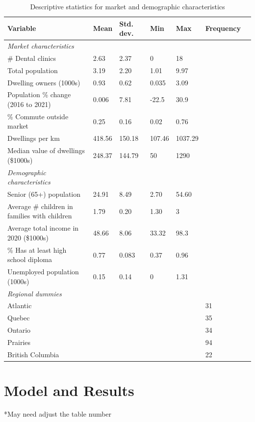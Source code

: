 \documentclass[a4paper,11pt]{article}
\begin{document}
\begin{table}[ht]
\centering
\caption{Descriptive statistics for market and demographic characteristics}
\label{table1}
\begin{tabular}{@{}lllllll@{}}
\toprule
Variable & Mean & Std. dev. & Min & Max & Frequency \\ \midrule
\textit{Market characteristics} & & & & & \\
\# Dental clinics & 2.63 & 2.37 & 0 & 18 &  \\
Total population & 3.19 & 2.20 & 1.01 & 9.97 & \\
Dwelling owners (1000s) & 0.93 & 0.62 & 0.035 & 3.09 & \\
Population \% change (2016 to 2021) & 0.006 &	7.81 & -22.5 & 30.9 & \\
\% Commute outside market & 0.25 & 0.16 & 0.02 & 0.76 & \\
Dwellings per km & 418.56 &	150.18 & 107.46 & 1037.29 & \\
Median value of dwellings (\$1000s) & 248.37 & 144.79 &	50 & 1290 & \\ 
\textit{Demographic characteristics} & & & & & \\
Senior (65+) population & 24.91 & 8.49 & 2.70 & 54.60 & \\
Average \# children in families with children & 1.79 & 0.20 & 1.30 & 3 & \\
Average total income in 2020 (\$1000s) & 48.66 & 8.06 & 33.32 & 98.3 & \\
\% Has at least high school diploma & 0.77 & 0.083 & 0.37 &	0.96 & \\
Unemployed population (1000s) & 0.15 & 0.14 & 0 & 1.31 & \\
\textit{Regional dummies} & & & & & \\
Atlantic & & & & & 31 \\
Quebec & & & & & 35 \\
Ontario & & & & & 34 \\
Prairies & & & & & 94 \\
British Columbia & & & & & 22 \\ \bottomrule
\end{tabular}
\end{table}

\section{Model and Results}


\alert{*May need adjust the table number}
\end{document}
